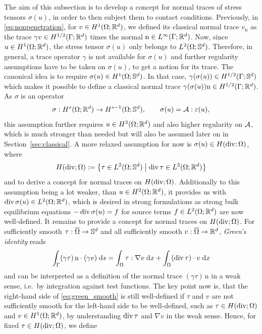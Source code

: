 The aim of this subsection is to develop a concept for normal traces of stress tensors $\sigma(u)$, in order to then subject them to contact conditions. Previously, in \eqref{eq:nonpenetration}, for $v\in H^1(\Omega;\R^d)$, we defined its classical normal trace $v_\mathrm{n}$ as the trace $\gamma v\in H^{1/2}(\Gamma;\R^d)$ times the normal $\mathrm{n}\in L^\infty(\Gamma;\R^d)$. Now, since $u\in H^1(\Omega;\R^d)$, the stress tensor $\sigma(u)$ only belongs to $L^2(\Omega;\S^d)$. Therefore, in general, a trace operator $\gamma$ is not available for $\sigma(u)$ and further regularity assumptions have to be taken on $\sigma(u)$, to get a notion for its trace. The canonical idea is to require $\sigma(u)\in H^1(\Omega;\S^d)$. In that case, $\gamma(\sigma(u))\in H^{1/2}(\Gamma;\S^d)$ which makes it possible to define a classical normal trace $\gamma(\sigma(u))\mathrm{n}\in H^{1/2}(\Gamma;\R^d)$. As $\sigma$ is an operator 
\begin{equation*}
	\sigma: H^s(\Omega;\R^d)\to H^{s-1}(\Omega;\S^d),\qquad \sigma(u)= \cA:\varepsilon(u),
\end{equation*}
this assumption further requires $u\in H^2(\Omega;\R^d)$ and also higher regularity on $\cA$, which is much stronger than needed but will also be assumed later on in Section~\ref{sec:classical}. A more relaxed assumption for now is $\sigma(u)\in H(\diver;\Omega)$, where
\begin{equation*}
	H(\diver;\Omega):=\left\{\tau\in L^2(\Omega;\S^d)\;\middle|\;\diver\tau\in L^2(\Omega;\R^d)\right\}
\end{equation*}
and to derive a concept for normal traces on $H(\diver;\Omega)$. Additionally to this assumption being a lot weaker, than $u\in H^2(\Omega;\R^d)$, it provides us with $\diver\sigma(u)\in L^2(\Omega;\R^d)$, which is desired in strong formulations as strong bulk equilibrium equations $-\diver\sigma(u) = f$ for source terms $f\in L^2(\Omega;\R^d)$ are now well-defined. It remains to provide a concept for normal traces on $H(\diver;\Omega)$. For sufficiently smooth $\tau:\overline{\Omega}\to\S^d$ and all sufficiently smooth $v:\overline{\Omega}\to\R^d$, {\em Green's identity} reads
\begin{equation}\label{eq:green_smooth}
	\int_\Gamma (\gamma\tau)\,\mathrm{n}\cdot(\gamma v)\;\ds  = \int_\Omega \tau : \nabla v\;\dx +\int_\Omega (\diver\tau)\cdot v\;\dx
\end{equation}
and can be interpreted as a definition of the normal trace $(\gamma\tau)\,\mathrm{n}$ in a weak sense, i.e.\ by integration against test functions. The key point now is, that the right-hand side of \eqref{eq:green_smooth} is still well-defined if $\tau$ and $v$ are not sufficiently smooth for the left-hand side to be well-defined, such as $\tau\in H(\diver;\Omega)$ and $v\in H^1(\Omega;\R^d)$, by understanding $\diver \tau$ and $\nabla v$ in the weak sense. Hence, for fixed $\tau\in H(\diver;\Omega)$, we define
